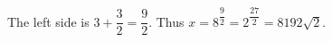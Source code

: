 The left side is $3+\dfrac{3}{2}=\dfrac{9}{2}$. Thus $x=8^{\dfrac{9}{2}}=2^{\dfrac{27}{2}}=\boxed{8192\sqrt2}$.
